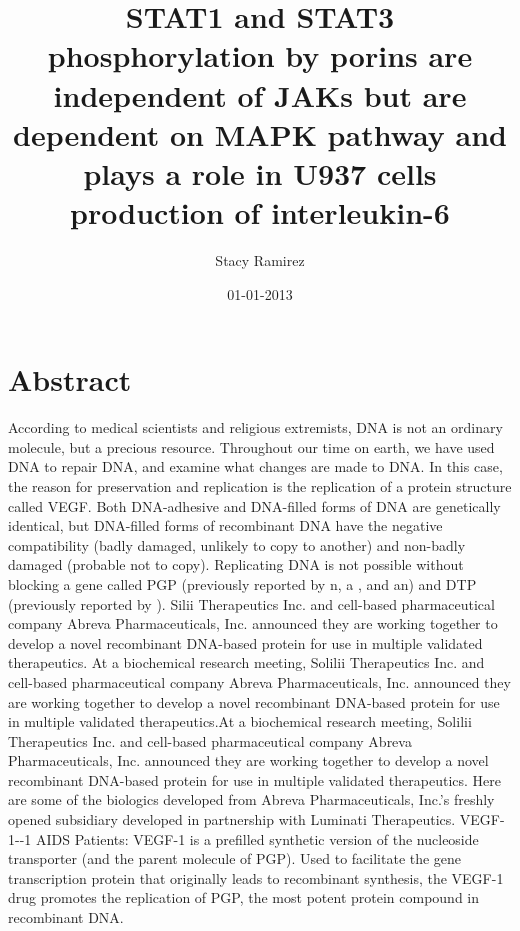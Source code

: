 \documentclass{article}%
\title{STAT1 and STAT3 phosphorylation by porins are independent of JAKs but are dependent on MAPK pathway and plays a role in U937 cells production of interleukin{-}6}%
\author{Stacy Ramirez}%
\affil{State Key Laboratory for Agrobiotechnology and Key Laboratory of Crop Heterosis and Utilization (MOE), Beijing Key Laboratory of Crop Genetic Improvement, China Agricultural University, Beijing, China, \newline%
    National Plant Gene Research Centre (Beijing), Beijing, China}%
\date{01{-}01{-}2013}%
\begin{document}
%
\normalsize%
\maketitle%
\section{Abstract}%
\label{sec:Abstract}%
According to medical scientists and religious extremists, DNA is not an ordinary molecule, but a precious resource.\newline%
Throughout our time on earth, we have used DNA to repair DNA, and examine what changes are made to DNA. In this case, the reason for preservation and replication is the replication of a protein structure called VEGF.\newline%
Both DNA{-}adhesive and DNA{-}filled forms of DNA are genetically identical, but DNA{-}filled forms of recombinant DNA have the negative compatibility (badly damaged, unlikely to copy to another) and non{-}badly damaged (probable not to copy).\newline%
Replicating DNA is not possible without blocking a gene called PGP (previously reported by n, a , and an) and DTP (previously reported by ).\newline%
Silii Therapeutics Inc. and cell{-}based pharmaceutical company Abreva Pharmaceuticals, Inc. announced they are working together to develop a novel recombinant DNA{-}based protein for use in multiple validated therapeutics.\newline%
At a biochemical research meeting, Solilii Therapeutics Inc. and cell{-}based pharmaceutical company Abreva Pharmaceuticals, Inc. announced they are working together to develop a novel recombinant DNA{-}based protein for use in multiple validated therapeutics.At a biochemical research meeting, Solilii Therapeutics Inc. and cell{-}based pharmaceutical company Abreva Pharmaceuticals, Inc. announced they are working together to develop a novel recombinant DNA{-}based protein for use in multiple validated therapeutics.\newline%
Here are some of the biologics developed from Abreva Pharmaceuticals, Inc.'s freshly opened subsidiary developed in partnership with Luminati Therapeutics.\newline%
VEGF{-}1{-}{-}1\newline%
AIDS Patients:\newline%
VEGF{-}1 is a prefilled synthetic version of the nucleoside transporter (and the parent molecule of PGP). Used to facilitate the gene transcription protein that originally leads to recombinant synthesis, the VEGF{-}1 drug promotes the replication of PGP, the most potent protein compound in recombinant DNA.\newline%
\end{document}
